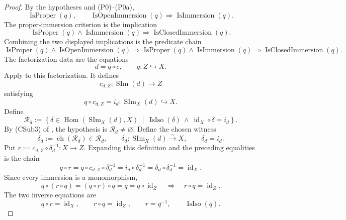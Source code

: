\begin{proof}
  By the hypotheses and (P0)--(P0a),
  \[
    \operatorname{IsProper}(q),
    \qquad
    \operatorname{IsOpenImmersion}(q)
      \Longrightarrow\operatorname{IsImmersion}(q).
  \]
  The proper-immersion criterion
  \cite[\href{https://stacks.math.columbia.edu/tag/01IQ}{Tag 01IQ}]
  {stacks-project} is the implication
  \[
    \operatorname{IsProper}(q)\wedge\operatorname{IsImmersion}(q)
      \Longrightarrow\operatorname{IsClosedImmersion}(q).       \tag{PD1}
  \]
  Combining the two displayed implications is the predicate chain
  \[
    \operatorname{IsProper}(q)\wedge
      \operatorname{IsOpenImmersion}(q)
    \Longrightarrow
    \operatorname{IsProper}(q)\wedge
      \operatorname{IsImmersion}(q)
    \Longrightarrow
    \operatorname{IsClosedImmersion}(q).
  \]
  The factorization data are the equations
  \[
    d=q\circ e,\qquad q\colon Z\hookrightarrow X.
  \]
  Apply  to this factorization.  It
  defines
  \[
    c_{d,Z}\colon\operatorname{SIm}(d)\longrightarrow Z
  \]
  satisfying
  \[
    q\circ c_{d,Z}
      =i_d\colon\operatorname{SIm}_X(d)\hookrightarrow X.
  \]
  Define
  \[
    \mathscr R_d:=
      \left\{\delta\in\operatorname{Hom}(\operatorname{SIm}_X(d),X)
        \ \middle|\
        \operatorname{IsIso}(\delta)\ \wedge\
        \operatorname{id}_X\circ\delta=i_d\right\}.
  \]
  By (CSub3) of , the hypothesis is
  $\mathscr R_d\ne\varnothing$.  Define the chosen witness
  \[
    \delta_d:=\operatorname{ch}(\mathscr R_d)\in\mathscr R_d,
    \qquad
    \delta_d\colon\operatorname{SIm}_X(d)\xrightarrow{\sim}X,
    \qquad
    \delta_d=i_d.
  \]
  Put $r:=c_{d,Z}\circ\delta_d^{-1}\colon X\to Z$.  Expanding this
  definition and the preceding equalities is the chain
  \[
    q\circ r
      =q\circ c_{d,Z}\circ\delta_d^{-1}
      =i_d\circ\delta_d^{-1}
      =\delta_d\circ\delta_d^{-1}
      =\operatorname{id}_X.
  \]
  Since every immersion is a monomorphism,
  \[
    q\circ(r\circ q)=(q\circ r)\circ q=q
      =q\circ\operatorname{id}_Z
    \quad\Longrightarrow\quad
    r\circ q=\operatorname{id}_Z.
  \]
  The two inverse equations are
  \[
    q\circ r=\operatorname{id}_X,\qquad
    r\circ q=\operatorname{id}_Z,\qquad
    r=q^{-1},\qquad
    \operatorname{IsIso}(q).
  \]
\end{proof}

